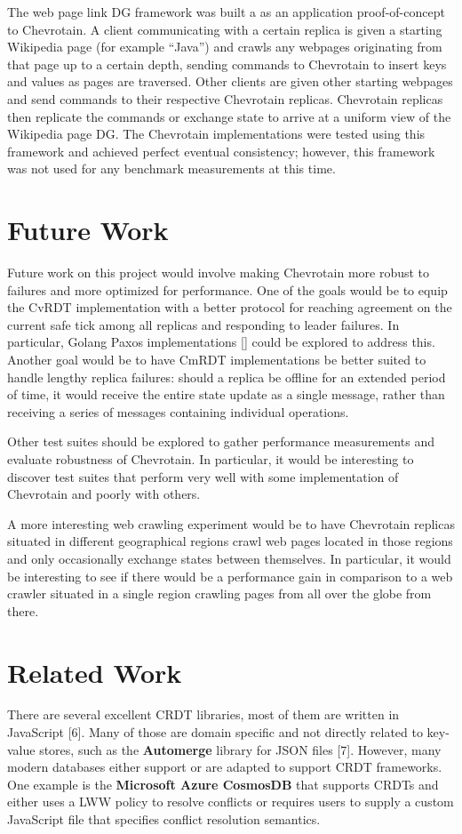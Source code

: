 \documentclass[sigconf,nonacm,10pt]{acmart}
\begin{document}
The web page link DG framework was built a as an application proof-of-concept to Chevrotain. A client communicating with a certain replica is given a starting Wikipedia page (for example ``Java'') and crawls any webpages originating from that page up to a certain depth, sending commands to Chevrotain to insert keys and values as pages are traversed. Other clients are given other starting webpages and send commands to their respective Chevrotain replicas. Chevrotain replicas then replicate the commands or exchange state to arrive at a uniform view of the Wikipedia page DG. The Chevrotain implementations were tested using this framework and achieved perfect eventual consistency; however, this framework was not used for any benchmark measurements at this time.

\section{Future Work}
Future work on this project would involve making Chevrotain more robust to failures and more optimized for performance. One of the goals would be to equip the CvRDT implementation with a better protocol for reaching agreement on the current safe tick among all replicas and responding to leader failures. In particular, Golang Paxos implementations [] could be explored to address this. Another goal would be to have CmRDT implementations be better suited to handle lengthy replica failures: should a replica be offline for an extended period of time, it would receive the entire state update as a single message, rather than receiving a series of messages containing individual operations.

Other test suites should be explored to gather performance measurements and evaluate robustness of Chevrotain. In particular, it would be interesting to discover test suites that perform very well with some implementation of Chevrotain and poorly with others.

A more interesting web crawling experiment would be to have Chevrotain replicas situated in different geographical regions crawl web pages located in those regions and only occasionally exchange states between themselves. In particular, it would be interesting to see if there would be a performance gain in comparison to a web crawler situated in a single region crawling pages from all over the globe from there.

\section{Related Work}
There are several excellent CRDT libraries, most of them are written in JavaScript [6]. Many of those are domain specific and not directly related to key-value stores, such as the \textbf{Automerge} library for JSON files [7]. However, many modern databases either support or are adapted to support CRDT frameworks. One example is the \textbf{Microsoft Azure CosmosDB} that supports CRDTs and either uses a LWW policy to resolve conflicts or requires users to supply a custom JavaScript file that specifies conflict resolution semantics.
\end{document}
